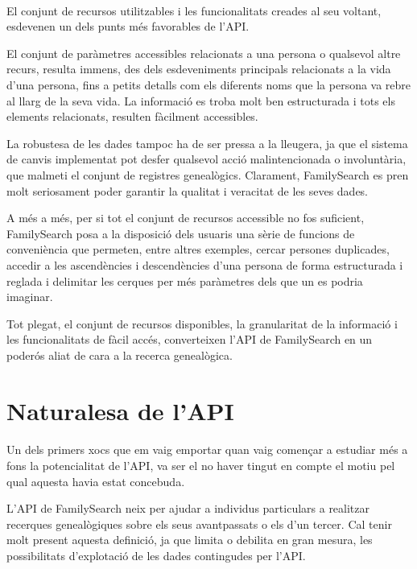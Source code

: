     \paragraph{}
    El conjunt de recursos utilitzables i les funcionalitats creades al seu voltant, esdevenen un dels punts més favorables de l'API.

    El conjunt de paràmetres accessibles relacionats a una persona o qualsevol altre recurs, resulta immens, des dels esdeveniments principals relacionats a la vida d'una persona, fins a petits detalls com els diferents noms que la persona va rebre al llarg de la seva vida. La informació es troba molt ben estructurada i tots els elements relacionats, resulten fàcilment accessibles.

    La robustesa de les dades tampoc ha de ser pressa a la lleugera, ja que el sistema de canvis implementat pot desfer qualsevol acció malintencionada o involuntària, que malmeti el conjunt de registres genealògics. Clarament, FamilySearch es pren molt seriosament poder garantir la qualitat i veracitat de les seves dades.

    A més a més, per si tot el conjunt de recursos accessible no fos suficient, Family\-Search posa a la disposició dels usuaris una sèrie de funcions de conveniència que permeten, entre altres exemples, cercar persones duplicades, accedir a les ascendències i descendències d'una persona de forma estructurada i reglada i delimitar les cerques per més paràmetres dels que un es podria imaginar.

    Tot plegat, el conjunt de recursos disponibles, la granularitat de la informació i les funcionalitats de fàcil accés, converteixen l'API de FamilySearch en un poderós aliat de cara a la recerca genealògica.


\section{Naturalesa de l'API}

    \paragraph{}
    Un dels primers xocs que em vaig emportar quan vaig començar a estudiar més a fons la potencialitat de l'API, va ser el no haver tingut en compte el motiu pel qual aquesta havia estat concebuda.

    L'API de FamilySearch neix per ajudar a individus particulars a realitzar recerques genealògiques sobre els seus avantpassats o els d'un tercer. Cal tenir molt present aquesta definició, ja que limita o debilita en gran mesura, les possibilitats d'explotació de les dades contingudes per l'API.

